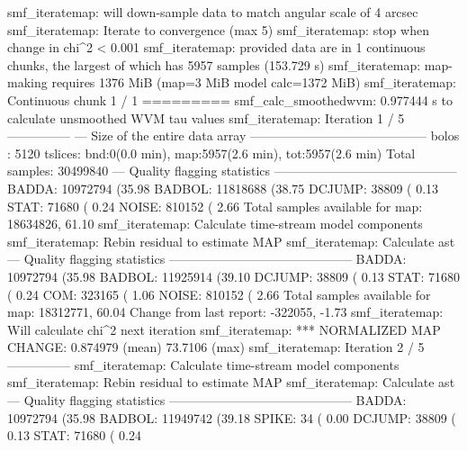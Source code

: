 \begin{terminalv}
smf_iteratemap: will down-sample data to match angular scale of 4 arcsec
smf_iteratemap: Iterate to convergence (max 5)
smf_iteratemap: stop when change in chi^2 < 0.001
smf_iteratemap: provided data are in 1 continuous chunks, the largest of which
has 5957 samples (153.729 s)
smf_iteratemap: map-making requires 1376 MiB (map=3 MiB model calc=1372 MiB)
smf_iteratemap: Continuous chunk 1 / 1 =========
smf_calc_smoothedwvm: 0.977444 s to calculate unsmoothed WVM tau values
smf_iteratemap: Iteration 1 / 5 ---------------
--- Size of the entire data array ------------------------------------------
bolos  : 5120
tslices: bnd:0(0.0 min), map:5957(2.6 min), tot:5957(2.6 min)
Total samples: 30499840
--- Quality flagging statistics --------------------------------------------
 BADDA:   10972794 (35.98%
BADBOL:   11818688 (38.75%
DCJUMP:      38809 ( 0.13%
  STAT:      71680 ( 0.24%
 NOISE:     810152 ( 2.66%
Total samples available for map:   18634826, 61.10%
smf_iteratemap: Calculate time-stream model components
smf_iteratemap: Rebin residual to estimate MAP
smf_iteratemap: Calculate ast
--- Quality flagging statistics --------------------------------------------
 BADDA:   10972794 (35.98%
BADBOL:   11925914 (39.10%
DCJUMP:      38809 ( 0.13%
  STAT:      71680 ( 0.24%
   COM:     323165 ( 1.06%
 NOISE:     810152 ( 2.66%
Total samples available for map:   18312771, 60.04%
     Change from last report:    -322055, -1.73%
smf_iteratemap: Will calculate chi^2 next iteration
smf_iteratemap: *** NORMALIZED MAP CHANGE: 0.874979 (mean) 73.7106 (max)
smf_iteratemap: Iteration 2 / 5 ---------------
smf_iteratemap: Calculate time-stream model components
smf_iteratemap: Rebin residual to estimate MAP
smf_iteratemap: Calculate ast
--- Quality flagging statistics --------------------------------------------
 BADDA:   10972794 (35.98%
BADBOL:   11949742 (39.18%
 SPIKE:         34 ( 0.00%
DCJUMP:      38809 ( 0.13%
  STAT:      71680 ( 0.24%

\end{terminalv}
